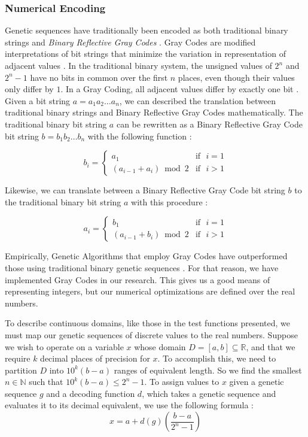  \subsubsection*{Numerical Encoding}
Genetic sequences have traditionally been encoded as both traditional binary strings and \emph{Binary Reflective Gray Codes} \cite{Whitley97}. Gray Codes are modified interpretations of bit strings that minimize the variation in representation of adjacent values \cite{Back93}. In the traditional binary system, the unsigned values of $2^n$ and $2^n - 1$ have no bits in common over the first $n$ places, even though their values only differ by $1$. In a Gray Coding, all adjacent values differ by exactly one bit \cite{Michalewicz98}. Given a bit string $a = a_1 a_2 \ldots a_n$, we can described the translation between traditional binary strings and Binary Reflective Gray Codes mathematically. The traditional binary bit string $a$ can be rewritten as a Binary Reflective Gray Code bit string $b =  b_1 b_2 \ldots b_n$ with the following function \cite{Back93}:

\begin{displaymath}
   b_i = \left\{
     \begin{array}{cr}
       a_1 & \text{if~ } i = 1 \\
       (a_{i-1} + a_i) \bmod{2} & \text{if~ } i > 1
     \end{array}
   \right.
\end{displaymath} 

Likewise, we can translate between a Binary Reflective Gray Code bit string $b$ to the traditional binary bit string $a$ with this procedure \cite{Back93}:

\begin{displaymath}
   a_i = \left\{
     \begin{array}{cr}
       b_1 & \text{if~ } i = 1 \\
       (a_{i-1} + b_i) \bmod{2} & \text{if~ } i > 1
     \end{array}
   \right.
\end{displaymath} 

Empirically, Genetic Algorithms that employ Gray Codes have outperformed those using traditional binary genetic sequences \cite{Back93}. For that reason, we have implemented Gray Codes in our research. This gives us a good means of representing integers, but our numerical optimizations are defined over the real numbers.

To describe continuous domains, like those in the test functions presented, we must map our genetic sequences of discrete values to the real numbers. Suppose we wish to operate on a variable $x$ whose domain $D = [a,b] \subseteq \mathbb{R}$, and that we require $k$ decimal places of precision for $x$. To accomplish this, we need to partition $D$ into $10^k(b - a)$ ranges of equivalent length. So we find the smallest $n \in \mathbb{N}$ such that $10^k(b - a) \leq 2^n - 1$. To assign values to $x$ given a genetic sequence $g$ and a decoding function $d$, which takes a genetic sequence and evaluates it to its decimal equivalent, we use the following formula \cite{Michalewicz98}:
\[ x = a + d(g) \left( \frac{b-a}{2^n - 1} \right) \]

